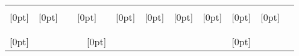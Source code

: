 \documentclass{LMCS}
\begin{document}
\begin{center}
\begin{tabular}{c ccc  ccc ccc cc  ccccc}
& \multicolumn{3}{c}{} &  \multicolumn{3}{c}{}  &  \multicolumn{3}{c}{}
                                       &  \multicolumn{2}{c}{}
                                       & \multicolumn{4}{c}{}
\\ \cline{2-16}
\raisebox{-1.5ex}[0pt]{} &  \multicolumn{3}{|c|}{\raisebox{-1.5ex}[0pt]{}}
     & \multicolumn{3}{|c|}{\raisebox{-1.5ex}[0pt]{}} & \multicolumn{3}{|c|}{\raisebox{-1.5ex}[0pt]{}}
                                &  \multicolumn{2}{c}{\raisebox{-1.5ex}[0pt]{}}
                                      &   \multicolumn{1}{|c|}{\raisebox{-1.5ex}[0pt]{}}
                                         &   \multicolumn{1}{|c|}{\raisebox{-1.5ex}[0pt]{}}
                                            &   \multicolumn{1}{|c|}{\raisebox{-1.5ex}[0pt]{}}
                                            & \multicolumn{1}{|c|}{\raisebox{-1.5ex}[0pt]{}} \\  & \multicolumn{1}{|c}{} &    \multicolumn{1}{c}{} & \multicolumn{1}{c|}{}   &  \multicolumn{1}{|c}{} &    \multicolumn{1}{c}{} & \multicolumn{1}{c|}{}     &  \multicolumn{1}{|c}{} &    \multicolumn{1}{c}{} & \multicolumn{1}{c|}{}     &  \multicolumn{1}{c}{}  &  \multicolumn{1}{c}{} &                    \multicolumn{1}{|c|}{} & \multicolumn{1}{|c|}{}  & \multicolumn{1}{|c|}{} & \multicolumn{1}{c|}{} \\  \cline{2-16}
     & \multicolumn{1}{|c}{} &    \multicolumn{1}{c}{} & \multicolumn{1}{c}{}      &  \multicolumn{1}{c}{} &    \multicolumn{1}{c}{} & \multicolumn{1}{c}{}      &  \multicolumn{1}{c}{} &    \multicolumn{1}{c}{} & \multicolumn{1}{c}{}     &  \multicolumn{1}{c}{}  &  \multicolumn{1}{c|}{} &                    \multicolumn{1}{c}{} & \multicolumn{1}{c}{}  & \multicolumn{1}{c}{} & \multicolumn{1}{c|}{} \\  \raisebox{-8ex}[0pt]{}           & \multicolumn{1}{|c}{} &    \multicolumn{1}{c}{} & \multicolumn{1}{c}{}      &  \multicolumn{1}{c}{} &    \multicolumn{1}{c}{} & \multicolumn{1}{c}{\raisebox{-12.5ex}[0pt]{}}      &  \multicolumn{1}{c}{} &    \multicolumn{1}{c}{} & \multicolumn{1}{c}{}     &  \multicolumn{1}{c}{}  &  \multicolumn{1}{c|}{}     &  \multicolumn{1}{c}{}
       &  \multicolumn{1}{c}{}  & \multicolumn{1}{c}{\raisebox{-7.5ex}[0pt]{}}

\end{tabular}
\end{center}
\end{document}

